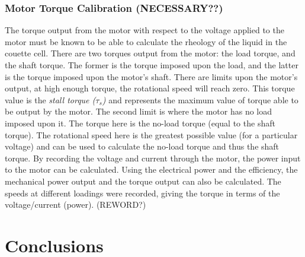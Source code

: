\documentclass[twoside,a4]{report}
\def\achapter{preamble}  %
\begin{document}
	\subsection{Motor Torque Calibration (NECESSARY??)}
	The torque output from the motor with respect to the voltage applied to the motor must be known to be able to calculate the rheology of the liquid in the couette cell. There are two torques output from the motor: the load torque, and the shaft torque. The former is the torque imposed upon the load, and the latter is the torque imposed upon the motor's shaft. \newline \newline \noindent 
	There are limits upon the motor's output, at high enough torque, the rotational speed will reach zero. This torque value is the \textit{stall torque (\(\tau_s\))} and represents the maximum value of torque able to be output by the motor. The second limit is where the motor has no load imposed upon it. The torque here is the no-load torque (equal to the shaft torque). The rotational speed here is the greatest possible value (for a particular voltage) and can be used to calculate the no-load torque and thus the shaft torque. \newline \newline \noindent
	By recording the voltage and current through the motor, the power input to the motor can be calculated. Using the electrical power and the efficiency, the mechanical power output and the torque output can also be calculated. The speeds at different loadings were recorded, giving the torque in terms of the voltage/current (power). (REWORD?)



	\chapter*{Conclusions}
	\def\achapter{Conclusions}
	
\end{document}
